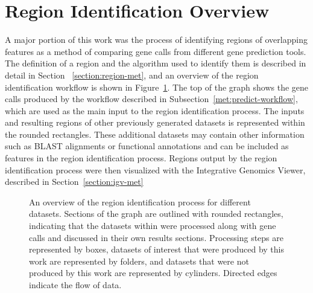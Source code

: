 \section{Region Identification Overview}
\label{section:region-overview}
A major portion of this work was the process of identifying regions of
overlapping features as a method of comparing gene calls from
different gene prediction tools. The definition of a region and the algorithm
used to identify them is described in detail in Section
~\ref{section:region-met}, and an overview of the region identification
workflow is shown in Figure~\ref{fig:region-overview}. The top of the
graph shows the gene calls produced by the workflow described in
Subsection~\ref{met:predict-workflow}, which are used as the main input
to the region identification process. The inputs and resulting regions of other previously
generated datasets is represented within the rounded rectangles. These additional datasets may contain other
information such as BLAST alignments or functional annotations and can
be included as features in the region identification process. Regions output by the region identification process
were then visualized with the Integrative Genomics Viewer, described
in Section~\ref{section:igv-met}

\begin{figure}
  \centering
  \caption[Region identification workflow]{An overview of the region identification process for
    different datasets. Sections of the graph are outlined with
    rounded rectangles, indicating that the datasets within were processed
    along with gene calls and discussed in their own results
    sections. Processing steps are represented by boxes, datasets of
    interest that were produced by this work are represented by
    folders, and datasets that were not produced by this work are
    represented by cylinders. Directed edges indicate the flow of
    data.}
  \label{fig:region-overview}
\end{figure}


